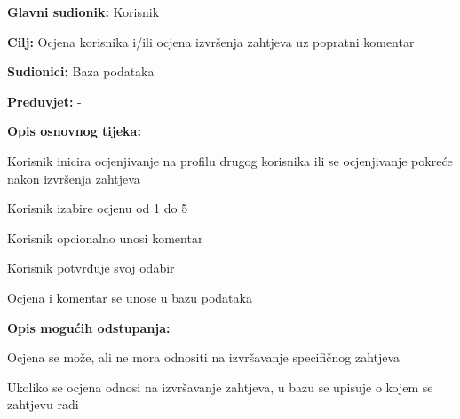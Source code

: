 					\noindent {}
					\begin{packed_item}
						
						\item \textbf{Glavni sudionik: }Korisnik
						\item  \textbf{Cilj:} Ocjena korisnika i/ili ocjena izvršenja zahtjeva uz popratni komentar 
						\item  \textbf{Sudionici:} Baza podataka
						\item  \textbf{Preduvjet:} -
						\item  \textbf{Opis osnovnog tijeka:}
						
						\item[] \begin{packed_enum}
							
							\item Korisnik inicira ocjenjivanje na profilu drugog korisnika ili se ocjenjivanje pokreće nakon izvršenja zahtjeva
							\item Korisnik izabire ocjenu od 1 do 5
							\item Korisnik opcionalno unosi komentar
							\item Korisnik potvrđuje svoj odabir
							\item Ocjena i komentar se unose u bazu podataka
						\end{packed_enum}
						
						\item  \textbf{Opis mogućih odstupanja:}
						
						\item[] \begin{packed_item}
							
							\item[2.a] Ocjena se može, ali ne mora odnositi na izvršavanje specifičnog zahtjeva
							\item[] \begin{packed_enum}
								
								\item Ukoliko se ocjena odnosi na izvršavanje zahtjeva, u bazu se upisuje o kojem se zahtjevu radi
								
							\end{packed_enum}
							
						\end{packed_item}
					\end{packed_item}
				
